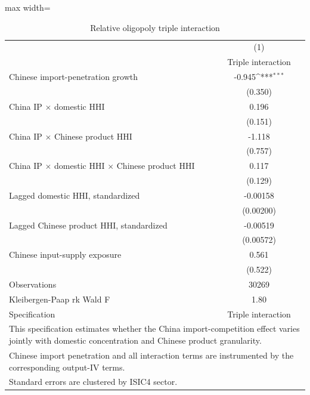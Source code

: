 \begin{table}[htbp]\centering
\def\sym#1{\ifmmode^{#1}\else\(^{#1}\)\fi}
\caption{Relative oligopoly triple interaction}
\label{tab:rob_chn_gran_triple}
\scriptsize
\setlength{\tabcolsep}{3pt}
\begin{adjustbox}{max width=\textwidth}
\begin{tabular}{l*{1}{c}}
\toprule
                &\multicolumn{1}{c}{(1)}\\
                &\multicolumn{1}{c}{Triple interaction}\\
\midrule
Chinese import-penetration growth&   -0.945\sym{***}\\
                &  (0.350)         \\
China IP $\times$ domestic HHI&    0.196         \\
                &  (0.151)         \\
China IP $\times$ Chinese product HHI&   -1.118         \\
                &  (0.757)         \\
China IP $\times$ domestic HHI $\times$ Chinese product HHI&    0.117         \\
                &  (0.129)         \\
Lagged domestic HHI, standardized& -0.00158         \\
                &(0.00200)         \\
Lagged Chinese product HHI, standardized& -0.00519         \\
                &(0.00572)         \\
Chinese input-supply exposure&    0.561         \\
                &  (0.522)         \\
\midrule
Observations    &    30269         \\
Kleibergen-Paap rk Wald F&     1.80         \\
Specification   &Triple interaction         \\
\bottomrule
\multicolumn{2}{l}{\footnotesize This specification estimates whether the China import-competition effect varies jointly with domestic concentration and Chinese product granularity.}\\
\multicolumn{2}{l}{\footnotesize Chinese import penetration and all interaction terms are instrumented by the corresponding output-IV terms.}\\
\multicolumn{2}{l}{\footnotesize Standard errors are clustered by ISIC4 sector.}\\
\end{tabular}
\end{adjustbox}
\end{table}
